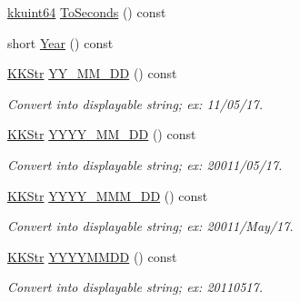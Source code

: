\begin{DoxyCompactItemize}
\item 
\hyperlink{namespace_k_k_b_a1f2b0568d3b63cc7697dcff73250113e}{kkuint64} \hyperlink{class_k_k_b_1_1_date_type_af5d609528ec049ab45ae1e1bd3039eda}{To\+Seconds} () const 
\item 
short \hyperlink{class_k_k_b_1_1_date_type_a153a587f1657fa1c1e4b8be97abe6190}{Year} () const 
\item 
\hyperlink{class_k_k_b_1_1_k_k_str}{K\+K\+Str} \hyperlink{class_k_k_b_1_1_date_type_a8e11cdeb7422367a922fc7259cf2a69a}{Y\+Y\+\_\+\+M\+M\+\_\+\+DD} () const 
\begin{DoxyCompactList}\small\item\em Convert into displayable string; ex\+: 11/05/17. \end{DoxyCompactList}\item 
\hyperlink{class_k_k_b_1_1_k_k_str}{K\+K\+Str} \hyperlink{class_k_k_b_1_1_date_type_abd409b4dc6e65f43d02da336a0fcb8b4}{Y\+Y\+Y\+Y\+\_\+\+M\+M\+\_\+\+DD} () const 
\begin{DoxyCompactList}\small\item\em Convert into displayable string; ex\+: 20011/05/17. \end{DoxyCompactList}\item 
\hyperlink{class_k_k_b_1_1_k_k_str}{K\+K\+Str} \hyperlink{class_k_k_b_1_1_date_type_a0781778726cef3361f76d62a2ff43708}{Y\+Y\+Y\+Y\+\_\+\+M\+M\+M\+\_\+\+DD} () const 
\begin{DoxyCompactList}\small\item\em Convert into displayable string; ex\+: 20011/\+May/17. \end{DoxyCompactList}\item 
\hyperlink{class_k_k_b_1_1_k_k_str}{K\+K\+Str} \hyperlink{class_k_k_b_1_1_date_type_a40b4aad78f416a6dae0db043e2925cb4}{Y\+Y\+Y\+Y\+M\+M\+DD} () const 
\begin{DoxyCompactList}\small\item\em Convert into displayable string; ex\+: 20110517. \end{DoxyCompactList}\end{DoxyCompactItemize}
